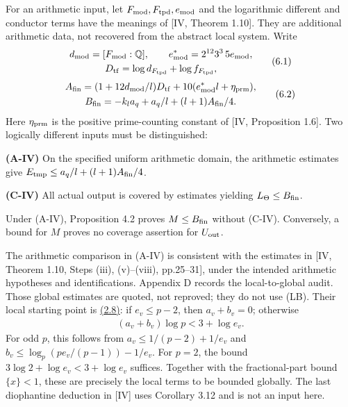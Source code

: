 \documentclass[11pt,a4paper]{amsart}
\begin{document}
For an arithmetic input, let $F_{\rm mod},F_{\rm tpd},e_{\rm mod}$ and the logarithmic different and conductor terms have the meanings of [IV, Theorem 1.10]. They are additional arithmetic data, not recovered from the abstract local system. Write
\begin{equation}
\begin{gathered}
d_{\rm mod}=[F_{\rm mod}:\mathbb Q],\qquad e^*_{\rm mod}=2^{12}3^3\,5e_{\rm mod},\\ D_{\rm tf}=\log d_{F_{\rm tpd}}+\log f_{F_{\rm tpd}},
\end{gathered}
\tag{6.1}\label{eq:6.1}
\end{equation}
\begin{equation}
\begin{gathered}
A_{\rm fin}=(1+12d_{\rm mod}/l)D_{\rm tf}+10(e^*_{\rm mod}l+\eta_{\rm prm}),\\ B_{\rm fin}=-k_la_q+a_q/l+(l+1)A_{\rm fin}/4.
\end{gathered}
\tag{6.2}\label{eq:6.2}
\end{equation}
Here $\eta_{\rm prm}$ is the positive prime-counting constant of [IV, Proposition 1.6]. Two logically different inputs must be distinguished:


\textbf{(A-IV)} On the specified uniform arithmetic domain, the arithmetic estimates give $E_{\rm tmp}\le a_q/l+(l+1)A_{\rm fin}/4$.


\textbf{(C-IV)} All actual output is covered by estimates yielding $L_\Theta\le B_{\rm fin}$.


Under (A-IV), Proposition 4.2 proves $M\le B_{\rm fin}$ without (C-IV). Conversely, a bound for $M$ proves no coverage assertion for $U_{\rm out}$.


The arithmetic comparison in (A-IV) is consistent with the estimates in [IV, Theorem 1.10, Steps (iii), (v)--(viii), pp.25--31], under the intended arithmetic hypotheses and identifications. Appendix D records the local-to-global audit. Those global estimates are quoted, not reproved; they do not use (LB). Their local starting point is \hyperref[eq:2.8]{(2.8)}: if $e_v\le p-2$, then $a_v+b_v=0$; otherwise
\begin{equation}
\begin{gathered}
(a_v+b_v)\log p<3+\log e_v.
\end{gathered}
\tag{6.3}\label{eq:6.3}
\end{equation}
For odd $p$, this follows from $a_v\le1/(p-2)+1/e_v$ and $b_v\le\log_p(pe_v/(p-1))-1/e_v$. For $p=2$, the bound $3\log2+\log e_v<3+\log e_v$ suffices. Together with the fractional-part bound $\{x\}<1$, these are precisely the local terms to be bounded globally. The last diophantine deduction in [IV] uses Corollary 3.12 and is not an input here.
\end{document}
